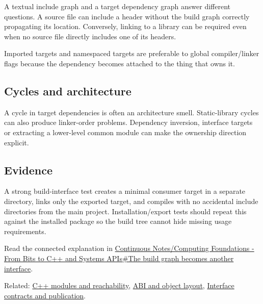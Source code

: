 A textual include graph and a target dependency graph answer different questions. A source file can include a header without the build graph correctly propagating its location. Conversely, linking to a library can be required even when no source file directly includes one of its headers.

Imported targets and namespaced targets are preferable to global compiler/linker flags because the dependency becomes attached to the thing that owns it.

\subsection{Cycles and architecture}\label{cycles-and-architecture}

A cycle in target dependencies is often an architecture smell. Static-library cycles can also produce linker-order problems. Dependency inversion, interface targets or extracting a lower-level common module can make the ownership direction explicit.

\subsection{Evidence}\label{evidence}

A strong build-interface test creates a minimal consumer target in a separate directory, links only the exported target, and compiles with no accidental include directories from the main project. Installation/export tests should repeat this against the installed package so the build tree cannot hide missing usage requirements.

Read the connected explanation in \href{Continuous\%20Notes/Computing\%20Foundations\%20-\%20From\%20Bits\%20to\%20C++\%20and\%20Systems\%20APIs\#The\%20build\%20graph\%20becomes\%20another\%20interface}{Continuous Notes/Computing Foundations - From Bits to C++ and Systems APIs\#The build graph becomes another interface}.

Related: \hyperref[appendix-410a611a5b8d]{C++ modules and reachability}, \hyperref[appendix-c4ac6bb0fff8]{ABI and object layout}, \hyperref[appendix-fdae7ff0a23f]{Interface contracts and publication}.
